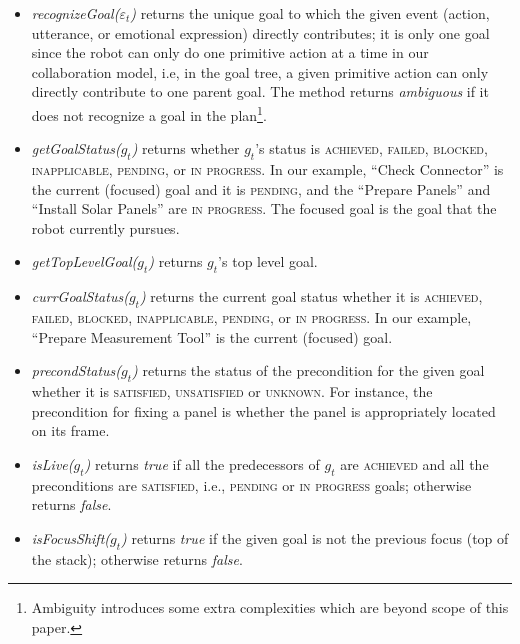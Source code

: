 \begin{itemize}[leftmargin=2pt]
  \setlength\itemsep{1mm}
  \item \textit{recognizeGoal($\varepsilon_t$)} returns the unique goal to which
  the given event (action, utterance, or emotional expression) directly
  contributes; it is only one goal since the robot can only do one primitive
  action at a time in our collaboration model, i.e, in the goal tree, a given
  primitive action can only directly contribute to one parent goal. The method
  returns \textit{ambiguous} if it does not recognize a goal in the
  plan\footnote{Ambiguity introduces some extra complexities which are beyond
  scope of this paper.}.
  
  \item \textit{getGoalStatus($g_t$)} returns whether $g_t$'s status is
  \textsc{achieved, failed, blocked, inapplicable, pending,} or \textsc{in
  progress}. In our example, ``Check Connector'' is the current (focused) goal
  and it is \textsc{pending}, and the ``Prepare Panels'' and ``Install Solar
  Panels'' are \textsc{in progress}. The focused goal is the goal that the robot
  currently pursues.
  
  \item \textit{getTopLevelGoal($g_t$)} returns $g_t$'s top level goal.
  
  \item \textit{currGoalStatus($g_t$)} returns the current goal status whether
  it is \textsc{achieved, failed, blocked, inapplicable, pending,} or \textsc{in
  progress}. In our example, ``Prepare Measurement Tool'' is the current
  (focused) goal.

  \item \textit{precondStatus($g_t$)} returns the status of the precondition for
  the given goal whether it is \textsc{satisfied, unsatisfied} or
  \textsc{unknown}. For instance, the precondition for fixing a panel is whether
  the panel is appropriately located on its frame.
  
  \item \textit{isLive($g_t$)} returns \textit{true} if all the predecessors of
  $g_t$ are \textsc{achieved} and all the preconditions are \textsc{satisfied},
  i.e., \textsc{pending} or \textsc{in progress} goals; otherwise returns
  \textit{false}.
  
  \item \textit{isFocusShift($g_t$)} returns \textit{true} if the given
  goal is not the previous focus (top of the stack); otherwise returns
  \textit{false}.
  

\end{itemize}
